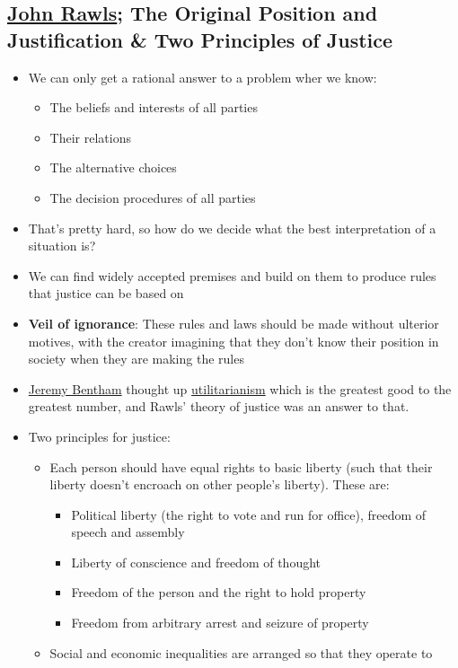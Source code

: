 \documentclass[11pt]{article}
\begin{document}
\subsection{\href{20200425095452-john\_rawls.org}{John Rawls};  The Original Position and Justification \& Two Principles of Justice}
\label{sec:orgaa76dac}
\begin{itemize}
\item We can only get a rational answer to a problem wher we know:
\begin{itemize}
\item The beliefs and interests of all parties
\item Their relations
\item The alternative choices
\item The decision procedures of all parties
\end{itemize}
\item That's pretty hard, so how do we decide what the best interpretation of a
situation is?
\item We can find widely accepted premises and build on them to produce rules that
justice can be based on
\item \textbf{Veil of ignorance}: These rules and laws should be made without ulterior
motives, with the creator imagining that they don't know their position in
society when they are making the rules
\item \href{20200430101630-jeremy\_bentham.org}{Jeremy Bentham} thought up \uline{utilitarianism} which is the greatest good to the
greatest number, and Rawls' theory of justice was an answer to that.
\item Two principles for justice:
\begin{itemize}
\item Each person should have equal rights to basic liberty (such that their
liberty doesn't encroach on other people's liberty). These are:
\begin{itemize}
\item Political liberty (the right to vote and run for office), freedom of
speech and assembly
\item Liberty of conscience and freedom of thought
\item Freedom of the person and the right to hold property
\item Freedom from arbitrary arrest and seizure of property
\end{itemize}
\item Social and economic inequalities are arranged so that they operate to

\end{itemize}
\end{itemize}
\end{document}
